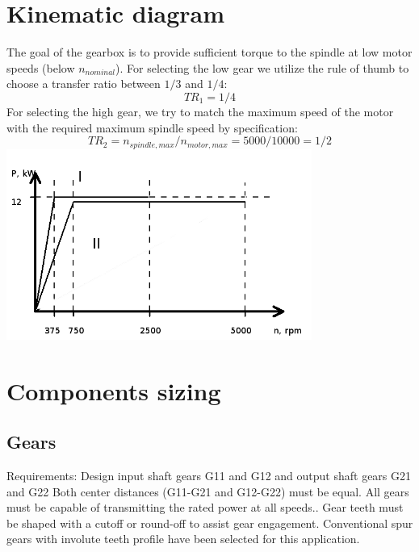 \documentclass{article}
\begin{document}
\section{Kinematic diagram} %
The goal of the gearbox is to provide sufficient torque to the spindle at low motor speeds (below $n_{nominal}$).
For selecting the low gear we utilize the rule of thumb to choose a transfer ratio between $1/3$ and $1/4$:
$$ TR_1 = 1/4 $$
For selecting the high gear, we try to match the maximum speed of the motor with the required maximum spindle speed by specification:
$$ TR_2 = n_{spindle, max} / n_{motor, max} = 5000 / 10000 = 1/2$$
\includegraphics[width=0.75\textwidth]{images/kinematics}~

\section{Components sizing}
\subsection{Gears}
Requirements: Design input shaft gears G11 and G12 and output shaft gears G21 and G22
Both center distances (G11-G21 and G12-G22) must be equal.
All gears must be capable of transmitting the rated power at all speeds..
Gear teeth must be shaped with a cutoff or round-off to assist gear engagement.  %
Conventional spur gears with involute teeth profile have been selected for this application.
\end{document}
